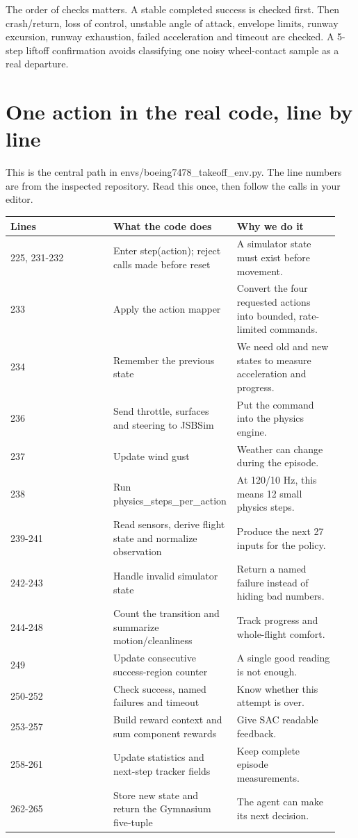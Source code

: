 \documentclass[11pt,a4paper]{article}
\begin{document}
The order of checks matters. A stable completed success is checked first. Then crash/return, loss of control, unstable angle of attack, envelope limits, runway excursion, runway exhaustion, failed acceleration and timeout are checked. A 5-step liftoff confirmation avoids classifying one noisy wheel-contact sample as a real departure.

\section{One action in the real code, line by line}
This is the central path in envs/boeing7478\_takeoff\_env.py. The line numbers are from the inspected repository. Read this once, then follow the calls in your editor.

\begin{longtable}{|p{0.313\linewidth}|p{0.313\linewidth}|p{0.313\linewidth}|}\hline
Lines & What the code does & Why we do it \\ \hline
225, 231-232 & Enter step(action); reject calls made before reset & A simulator state must exist before movement. \\ \hline
233 & Apply the action mapper & Convert the four requested actions into bounded, rate-limited commands. \\ \hline
234 & Remember the previous state & We need old and new states to measure acceleration and progress. \\ \hline
236 & Send throttle, surfaces and steering to JSBSim & Put the command into the physics engine. \\ \hline
237 & Update wind gust & Weather can change during the episode. \\ \hline
238 & Run physics\_steps\_per\_action & At 120/10 Hz, this means 12 small physics steps. \\ \hline
239-241 & Read sensors, derive flight state and normalize observation & Produce the next 27 inputs for the policy. \\ \hline
242-243 & Handle invalid simulator state & Return a named failure instead of hiding bad numbers. \\ \hline
244-248 & Count the transition and summarize motion/cleanliness & Track progress and whole-flight comfort. \\ \hline
249 & Update consecutive success-region counter & A single good reading is not enough. \\ \hline
250-252 & Check success, named failures and timeout & Know whether this attempt is over. \\ \hline
253-257 & Build reward context and sum component rewards & Give SAC readable feedback. \\ \hline
258-261 & Update statistics and next-step tracker fields & Keep complete episode measurements. \\ \hline
262-265 & Store new state and return the Gymnasium five-tuple & The agent can make its next decision. \\ \hline
\end{longtable}
\end{document}
